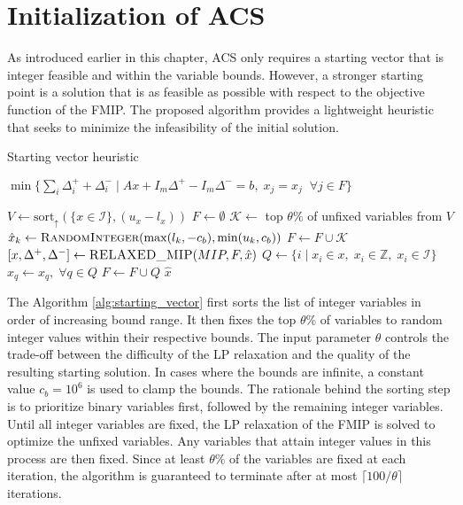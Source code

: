 \section{Initialization of ACS}
As introduced earlier in this chapter, ACS only requires a starting vector that is integer feasible and within the variable bounds. However, a stronger starting point is a solution that is as feasible as possible with respect to the objective function of the FMIP.
The proposed algorithm provides a lightweight heuristic that seeks to minimize the infeasibility of the initial solution.
\begin{algorithm}
\caption{Starting vector heuristic}\label{alg:starting_vector}
\begin{algorithmic}
    \State \Return $\min\{\sum_i \Delta_i^+ + \Delta_i^- \mid A x + I_m \Delta^+ - I_m \Delta^- = b, \; x_j = \hat{x}_j \;\; \forall j \in F\}$
\EndFunction
\end{algorithmic}
\vspace{1em}
\begin{algorithmic}[1]
\Require{Original $MIP$ formulation; Percentage of variables to fix $\theta \in (0,100]$; Fixed bound constant $c_b$}
\State $V \gets \text{sort}_\uparrow(\{x \in \mathcal{I}\}, (u_x-l_x))$
\State $F \gets \emptyset$
    \State $\mathcal{K} \gets$ top $\theta \%$ of unfixed variables from $V$
        \State $\hat{x}_k \gets \Call{RandomInteger}{\max(l_k, -c_b), \min(u_k, c_b)}$
    \EndFor
    \State $F \gets F \cup \mathcal{K}$
    \State $[x, \Delta^+, \Delta^-] \gets \Call{RELAXED\_MIP}{MIP,F,\hat{x}}$
    \State $Q \gets \{i \;|\; x_i \in x,\; x_i \in \mathbb{Z},\; x_i \in \mathcal{I}\}$
    \State $\hat{x}_q \gets x_q, \; \forall q \in Q$
    \State $F \gets F \cup Q$
\EndWhile
\State \Return $\hat{x}$
\EndFunction
\end{algorithmic}
\end{algorithm}
The Algorithm \ref{alg:starting_vector} first sorts the list of integer variables in order of increasing bound range. It then fixes the top $\theta$\% of variables to random integer values within their respective bounds. The input parameter $\theta$ controls the trade-off between the difficulty of the LP relaxation and the quality of the resulting starting solution. In cases where the bounds are infinite, a constant value $c_b = 10^6$ is used to clamp the bounds.
The rationale behind the sorting step is to prioritize binary variables first, followed by the remaining integer variables.
Until all integer variables are fixed, the LP relaxation of the FMIP is solved to optimize the unfixed variables. Any variables that attain integer values in this process are then fixed.
Since at least $\theta$\% of the variables are fixed at each iteration, the algorithm is guaranteed to terminate after at most $\lceil 100 / \theta \rceil$ iterations.

